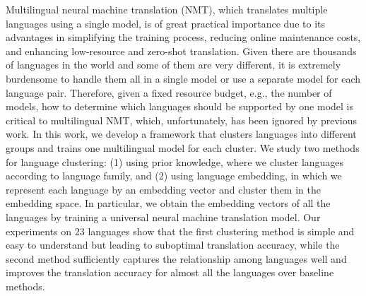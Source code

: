 Multilingual neural machine translation (NMT), which translates multiple languages using a single model, is of great practical importance due to its advantages in simplifying the training process, reducing online maintenance costs, and enhancing low-resource and zero-shot translation.  Given there are thousands of languages in the world and some of them are very different, it is extremely burdensome to handle them all in a single model or use a separate model for each language pair. Therefore, given a fixed resource budget, e.g., the number of models, how to determine which languages should be supported by one model is critical to multilingual NMT, which, unfortunately, has been ignored by previous work. In this work, we develop a framework that clusters languages into different groups and trains one multilingual model for each cluster. We study two methods for language clustering: (1) using prior knowledge, where we cluster languages according to language family, and (2) using language embedding, in which we represent each language by an embedding vector and cluster them in the embedding space. In particular, we obtain the embedding vectors of all the languages by training a universal neural machine translation model. Our experiments on 23 languages show that the first clustering method is simple and easy to understand but leading to suboptimal translation accuracy, while the second method sufficiently captures the relationship among languages well and improves the translation accuracy for almost all the languages over baseline methods.